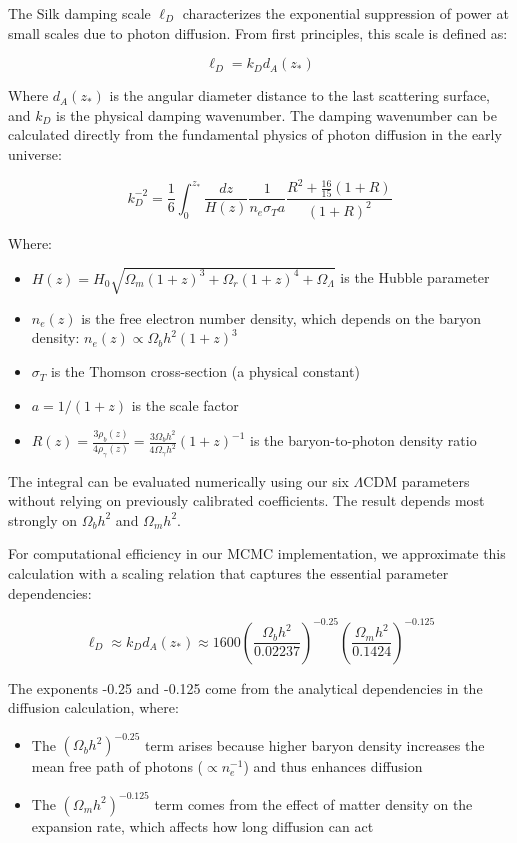 \documentclass[11pt]{article}
\begin{document}
The Silk damping scale $\ell_D$ characterizes the exponential suppression of power at small scales due to photon diffusion. From first principles, this scale is defined as:

\begin{equation}
\ell_D = k_D d_A(z_*)
\end{equation}

Where $d_A(z_*)$ is the angular diameter distance to the last scattering surface, and $k_D$ is the physical damping wavenumber. The damping wavenumber can be calculated directly from the fundamental physics of photon diffusion in the early universe:

\begin{equation}
k_D^{-2} = \frac{1}{6} \int_{0}^{z_*} \frac{dz}{H(z)} \frac{1}{n_e \sigma_T a} \frac{R^2 + \frac{16}{15}(1+R)}{(1+R)^2}
\end{equation}

Where:
\begin{itemize}
\item $H(z) = H_0 \sqrt{\Omega_m(1+z)^3 + \Omega_r(1+z)^4 + \Omega_\Lambda}$ is the Hubble parameter
\item $n_e(z)$ is the free electron number density, which depends on the baryon density: $n_e(z) \propto \Omega_b h^2 (1+z)^3$
\item $\sigma_T$ is the Thomson cross-section (a physical constant)
\item $a = 1/(1+z)$ is the scale factor
\item $R(z) = \frac{3\rho_b(z)}{4\rho_\gamma(z)} = \frac{3\Omega_b h^2}{4\Omega_\gamma h^2}(1+z)^{-1}$ is the baryon-to-photon density ratio
\end{itemize}

The integral can be evaluated numerically using our six $\Lambda$CDM parameters without relying on previously calibrated coefficients. The result depends most strongly on $\Omega_b h^2$ and $\Omega_m h^2$.

For computational efficiency in our MCMC implementation, we approximate this calculation with a scaling relation that captures the essential parameter dependencies:

\begin{equation}
\ell_D \approx k_D d_A(z_*) \approx 1600 \left(\frac{\Omega_b h^2}{0.02237}\right)^{-0.25} \left(\frac{\Omega_m h^2}{0.1424}\right)^{-0.125}
\end{equation}

The exponents -0.25 and -0.125 come from the analytical dependencies in the diffusion calculation, where:
\begin{itemize}
\item The $(\Omega_b h^2)^{-0.25}$ term arises because higher baryon density increases the mean free path of photons ($\propto n_e^{-1}$) and thus enhances diffusion
\item The $(\Omega_m h^2)^{-0.125}$ term comes from the effect of matter density on the expansion rate, which affects how long diffusion can act
\end{itemize}
\end{document}

